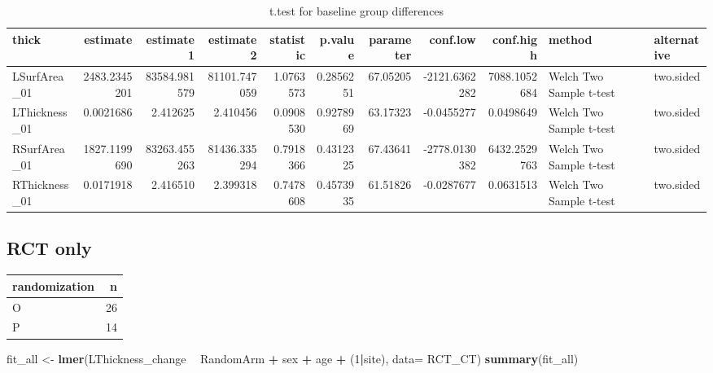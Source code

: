 \documentclass[]{article}
\newenvironment{Shaded}{\begin{snugshade}}{\end{snugshade}}
\newcommand{\KeywordTok}[1]{\textcolor[rgb]{0.13,0.29,0.53}{\textbf{#1}}}
\newcommand{\DataTypeTok}[1]{\textcolor[rgb]{0.13,0.29,0.53}{#1}}
\newcommand{\DecValTok}[1]{\textcolor[rgb]{0.00,0.00,0.81}{#1}}
\newcommand{\StringTok}[1]{\textcolor[rgb]{0.31,0.60,0.02}{#1}}
\newcommand{\OperatorTok}[1]{\textcolor[rgb]{0.81,0.36,0.00}{\textbf{#1}}}
\newcommand{\NormalTok}[1]{#1}
\theoremstyle{definition}
\theoremstyle{definition}
\theoremstyle{definition}
\theoremstyle{remark}
\begin{document}
\begin{table}[t]

\caption{\label{tab:unnamed-chunk-4}t.test for baseline group differences}
\centering
\begin{tabular}{l|r|r|r|r|r|r|r|r|l|l}
\hline
thick & estimate & estimate1 & estimate2 & statistic & p.value & parameter & conf.low & conf.high & method & alternative\\
\hline
LSurfArea\_01 & 2483.2345201 & 83584.981579 & 81101.747059 & 1.0763573 & 0.2856251 & 67.05205 & -2121.6362282 & 7088.1052684 & Welch Two Sample t-test & two.sided\\
\hline
LThickness\_01 & 0.0021686 & 2.412625 & 2.410456 & 0.0908530 & 0.9278969 & 63.17323 & -0.0455277 & 0.0498649 & Welch Two Sample t-test & two.sided\\
\hline
RSurfArea\_01 & 1827.1199690 & 83263.455263 & 81436.335294 & 0.7918366 & 0.4312325 & 67.43641 & -2778.0130382 & 6432.2529763 & Welch Two Sample t-test & two.sided\\
\hline
RThickness\_01 & 0.0171918 & 2.416510 & 2.399318 & 0.7478608 & 0.4573935 & 61.51826 & -0.0287677 & 0.0631513 & Welch Two Sample t-test & two.sided\\
\hline
\end{tabular}
\end{table}

\subsection{RCT only}\label{rct-only}

\begin{Shaded}
\end{Shaded}

\begin{tabular}{l|r}
\hline
randomization & n\\
\hline
O & 26\\
\hline
P & 14\\
\hline
\end{tabular}

\begin{Shaded}
\begin{Highlighting}[]
\NormalTok{fit_all <-}\StringTok{ }\KeywordTok{lmer}\NormalTok{(LThickness_change }\OperatorTok{~}\StringTok{ }\NormalTok{RandomArm }\OperatorTok{+}\StringTok{ }\NormalTok{sex }\OperatorTok{+}\StringTok{ }\NormalTok{age }\OperatorTok{+}\StringTok{ }\NormalTok{(}\DecValTok{1}\OperatorTok{|}\NormalTok{site), }\DataTypeTok{data=}\NormalTok{ RCT_CT)}
\KeywordTok{summary}\NormalTok{(fit_all)  }
\end{Highlighting}
\end{Shaded}
\end{document}
